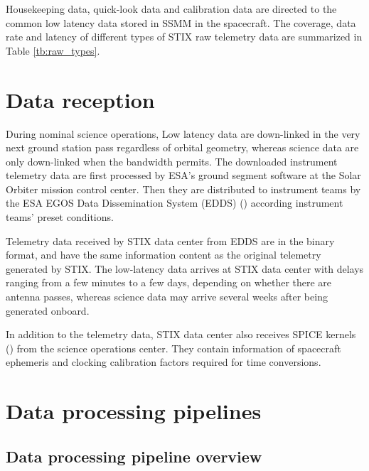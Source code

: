 \documentclass[referee]{aa} %
\begin{document}
Housekeeping data, quick-look data and calibration data are directed to the
common low latency data stored in SSMM in the spacecraft.
The coverage, data rate and latency of 
different types of STIX raw telemetry data are
summarized in Table \ref{tb:raw_types}.


\section{Data reception}

During nominal science operations,
Low latency data are down-linked in the very next ground station pass regardless of orbital geometry, 
whereas science data are only down-linked when the bandwidth permits.
The downloaded instrument telemetry data are first processed by ESA's ground segment
software at the Solar Orbiter mission control center. Then they
are distributed to instrument teams by the ESA EGOS Data
Dissemination System (EDDS) (\cite{EDDS}) according instrument teams' preset conditions.

Telemetry data received by STIX data center from EDDS  are in the binary format, and have the same
 information content as the original telemetry generated by STIX.
The low-latency data arrives at STIX data center with delays ranging from a few minutes to a few days, depending on whether there
are antenna passes, whereas science data may arrive several weeks after being generated onboard.

In addition to the telemetry data, STIX data center also receives SPICE kernels (\cite{spice1996,spice2018})  from the science operations center.
They contain information of spacecraft ephemeris and clocking calibration factors required for time conversions.


\section{Data processing pipelines}
\subsection{Data processing pipeline overview}
\end{document}
